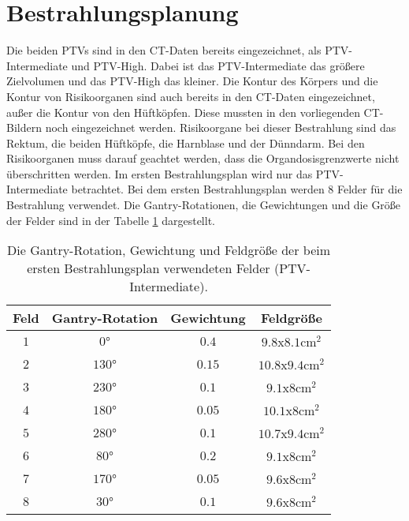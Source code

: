 \section{Bestrahlungsplanung}
\label{sec:Bestrahlungsplanung}
Die beiden PTVs sind in den CT-Daten bereits eingezeichnet, als PTV-Intermediate und PTV-High.
Dabei ist das PTV-Intermediate das größere Zielvolumen und das PTV-High das kleiner.
Die Kontur des Körpers und die Kontur von Risikoorganen sind auch bereits in den CT-Daten eingezeichnet, außer die Kontur von den Hüftköpfen.
Diese mussten in den vorliegenden CT-Bildern noch eingezeichnet werden. Risikoorgane bei dieser Bestrahlung sind das Rektum, die beiden
Hüftköpfe, die Harnblase und der Dünndarm. Bei den Risikoorganen muss darauf geachtet werden, dass die Organdosisgrenzwerte nicht überschritten werden.
Im ersten Bestrahlungsplan wird nur das PTV-Intermediate betrachtet. Bei dem ersten Bestrahlungsplan werden 8 Felder für die Bestrahlung verwendet.
Die Gantry-Rotationen, die Gewichtungen und die Größe der Felder sind in der Tabelle \ref{tab:Felder1} dargestellt.

\begin{table}
	\centering
	\caption{Die Gantry-Rotation, Gewichtung und Feldgröße der beim ersten Bestrahlungsplan verwendeten Felder (PTV-Intermediate).}
	\label{tab:Felder1}
	\begin{tabular}{c c c c}
		\toprule
		Feld & Gantry-Rotation & Gewichtung & Feldgröße\\
		\midrule
		$1$ & $0°$   & $0.4$ & $\num{9.8}$x$\num{8.1} \si{\centi\meter\squared}$ \\
		$2$ & $130°$  & $0.15$ & $\num{10.8}$x$\num{9.4} \si{\centi\meter\squared}$ \\
		$3$ & $230°$ & $0.1$ & $\num{9.1}$x$\num{8} \si{\centi\meter\squared}$ \\
		$4$ & $180°$ & $0.05$ & $\num{10.1}$x$\num{8} \si{\centi\meter\squared}$ \\
		$5$ & $280°$ & $0.1$ & $\num{10.7}$x$\num{9.4} \si{\centi\meter\squared}$ \\
		$6$ & $80°$ & $0.2$ & $\num{9.1}$x$\num{8} \si{\centi\meter\squared}$ \\
		$7$ & $170°$ & $0.05$ & $\num{9.6}$x$\num{8} \si{\centi\meter\squared}$ \\
		$8$ & $30°$ & $0.1$ & $\num{9.6}$x$\num{8} \si{\centi\meter\squared}$ \\
		\bottomrule
	\end{tabular}
\end{table}

